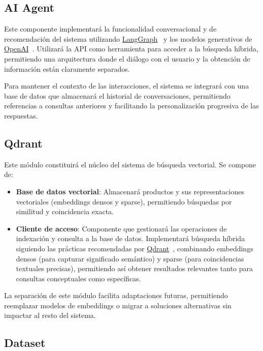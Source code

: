 \documentclass[12pt]{article}
\begin{document}
\subsection{AI Agent}

Este componente implementará la funcionalidad conversacional y de recomendación del sistema utilizando \href{https://www.langchain.com/langgraph}{LangGraph}~\cite{LangGraph} y los modelos generativos de \href{https://openai.com/}{OpenAI}~\cite{OpenAI}. Utilizará la API como herramienta para acceder a la búsqueda híbrida, permitiendo una arquitectura donde el diálogo con el usuario y la obtención de información están claramente separados.

Para mantener el contexto de las interacciones, el sistema se integrará con una base de datos que almacenará el historial de conversaciones, permitiendo referencias a consultas anteriores y facilitando la personalización progresiva de las respuestas.

\subsection{Qdrant}

Este módulo constituirá el núcleo del sistema de búsqueda vectorial. Se compone de:

\begin{itemize}
    \item \textbf{Base de datos vectorial}: Almacenará productos y sus representaciones vectoriales (embeddings densos y sparse), permitiendo búsquedas por similitud y coincidencia exacta.

    \item \textbf{Cliente de acceso}: Componente que gestionará las operaciones de indexación y consulta a la base de datos. Implementará búsqueda híbrida siguiendo las prácticas recomendadas por \href{https://qdrant.tech/documentation/search-precision/reranking-hybrid-search/}{Qdrant}~\cite{Qdrant}, combinando embeddings densos (para capturar significado semántico) y sparse (para coincidencias textuales precisas), permitiendo así obtener resultados relevantes tanto para consultas conceptuales como específicas.
\end{itemize}

La separación de este módulo facilita adaptaciones futuras, permitiendo reemplazar modelos de embeddings o migrar a soluciones alternativas sin impactar al resto del sistema.

\subsection{Dataset}
\end{document}
